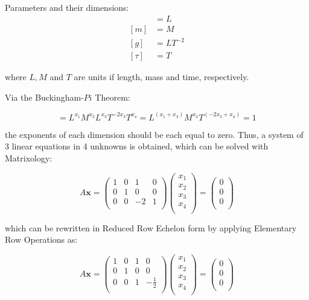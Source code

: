 \documentclass{article}
\begin{document}
Parameters and their dimensions: \begin{align}
[\ell] &= L \\
[m] &= M \\
[g] &= LT^{-2} \\
[\tau] &= T
\end{align}

where $L,M$ and $T$ are units if length, mass and time, respectively.

Via the Buckingham-$Pi$ Theorem:

\begin{equation}
[\pi_1] = L^{x_1} M^{x_2} L^{x_3} T^{-2x_3} T^{x_4} = L^{(x_1 + x_3)} M^{x_2} T^{(-2x_3 + x_4)}   = 1
\end{equation}

the exponents of each dimension should be each equal to zero. Thus, a system of 3 linear equations in 4 unknowns is obtained, which can be solved with Matrixology:

\begin{equation}
A\bm{x} = \begin{pmatrix}
1&0&1&0 \\
0&1&0&0 \\
0&0&-2&1 \\
\end{pmatrix}
\begin{pmatrix}
x_1\\
x_2\\
x_3\\
x_4\\
\end{pmatrix}
=
\begin{pmatrix}
0\\
0\\
0\\
\end{pmatrix}
\end{equation}

which can be rewritten in Reduced Row Echelon form by applying Elementary Row Operations as:

\begin{equation}
A\bm{x} = \begin{pmatrix}
1&0&1&0 \\
0&1&0&0 \\
0&0&1&-\frac{1}{2} \\
\end{pmatrix}
\begin{pmatrix}
x_1\\
x_2\\
x_3\\
x_4\\
\end{pmatrix}
=
\begin{pmatrix}
0\\
0\\
0\\
\end{pmatrix}
\end{equation}
\end{document}
